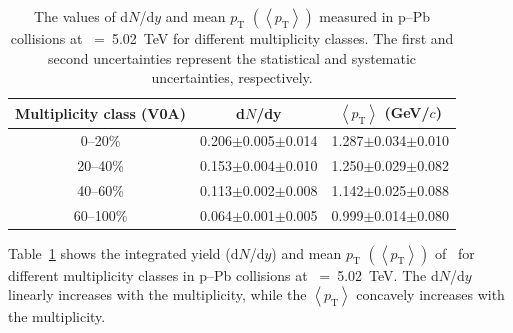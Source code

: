 \begin{table}[h!]
\caption{The values of d$N$/d$y$ and mean $p_{\mathrm{T}}$ $\left( \left\langle p_{\mathrm{T}} \right\rangle \right)$ measured in p--Pb collisions at \snn~=~5.02~TeV for different multiplicity classes. The first and second uncertainties represent the statistical and systematic uncertainties, respectively.}
\centering
\begin{tabular}{ccc}
\hline 
Multiplicity class (V0A) & d$N$/dy & $\left\langle p_{\mathrm{T}} \right\rangle$ (GeV/$c$) \\ \hline
0--20\% & 0.206$\pm$0.005$\pm$0.014 & 1.287$\pm$0.034$\pm$0.010 \\
20--40\% & 0.153$\pm$0.004$\pm$0.010 & 1.250$\pm$0.029$\pm$0.082 \\
40--60\% & 0.113$\pm$0.002$\pm$0.008 & 1.142$\pm$0.025$\pm$0.088 \\
60--100\% & 0.064$\pm$0.001$\pm$0.005 & 0.999$\pm$0.014$\pm$0.080 \\
\hline
\end{tabular}
\label{tab:ymp}
\end{table}

Table~\ref{tab:ymp} shows the integrated yield (d$N$/d$y$) and mean $p_{\mathrm{T}}$ $\left( \left\langle p_{\mathrm{T}} \right\rangle \right)$ of \fzero~for different multiplicity classes in p--Pb collisions at \snn~=~5.02~TeV. The d$N$/d$y$ linearly increases with the multiplicity, while the $\left\langle p_{\mathrm{T}} \right\rangle$ concavely increases with the multiplicity. 

